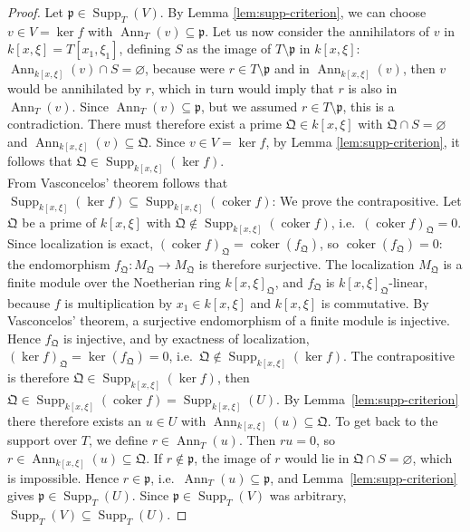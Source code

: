 \documentclass[pdflatex,sn-mathphys-num]{sn-jnl}
\numberwithin{equation}{section}
\theoremstyle{thmstyleone}
\theoremstyle{thmstyletwo}
\newcommand{\Supp}{\operatorname{Supp}}
\begin{document}
\begin{proof}
Let $\mathfrak p\in\operatorname{Supp}_T(V)$. By Lemma \ref{lem:supp-criterion}, we can choose $v\in V=\ker f$ with
$\operatorname{Ann}_T(v)\subseteq\mathfrak p$. Let us now consider the annihilators of $v$ in $k[x,\xi]=T[x_1, \xi_1]$, defining $S$ as the image of $T\setminus \mathfrak p$ in $k[x,\xi]$: $\operatorname{Ann}_{k[x,\xi]}(v)\cap S = \varnothing$, because were $r \in T\setminus\mathfrak p$ and in $\operatorname{Ann}_{k[x,\xi]}(v)$, then $v$ would be annihilated by $r$, which in turn would imply that $r$ is also in $\operatorname{Ann}_T(v)$. Since $\operatorname{Ann}_T(v) \subseteq \mathfrak p$, but we assumed $r \in T\setminus\mathfrak p$, this is a contradiction. There must therefore exist a prime $\mathfrak Q \in k[x,\xi]$ with $\mathfrak Q \cap S = \varnothing$ and $\operatorname{Ann}_{k[x,\xi]}(v) \subseteq \mathfrak Q$. Since $v \in V = \ker f$, by Lemma \ref{lem:supp-criterion}, it follows that $\mathfrak Q \in \Supp_{k[x,\xi]}(\ker f).$\\
From Vasconcelos' theorem \cite[Theorem~2.4]{matsumura} \cite{vasconcelos} follows that $\operatorname{Supp}_{k[x,\xi]}(\ker f)\subseteq \operatorname{Supp}_{k[x,\xi]}(\operatorname{coker}f)$: 
We prove the contrapositive. Let $\mathfrak Q$ be a prime of ${k[x,\xi]}$ with
$\mathfrak Q\notin\operatorname{Supp}_{k[x,\xi]}(\operatorname{coker}f)$, i.e.\
$(\operatorname{coker}f)_{\mathfrak Q}=0$.
Since localization is exact, $(\operatorname{coker}f)_{\mathfrak Q}=
\operatorname{coker}(f_{\mathfrak Q})$, so
$\operatorname{coker}(f_{\mathfrak Q})=0$: the endomorphism
$f_{\mathfrak Q}\colon M_{\mathfrak Q}\to M_{\mathfrak Q}$ is therefore surjective.
The localization $M_{\mathfrak Q}$ is a finite module over the Noetherian ring
${k[x,\xi]}_{\mathfrak Q}$, and $f_{\mathfrak Q}$ is ${k[x,\xi]}_{\mathfrak Q}$-linear, because
$f$ is multiplication by $x_1\in {k[x,\xi]}$ and ${k[x,\xi]}$ is commutative. By Vasconcelos'
theorem, a surjective endomorphism of a finite module is injective. Hence
$f_{\mathfrak Q}$ is injective, and by exactness of localization,
$(\ker f)_{\mathfrak Q}=\ker(f_{\mathfrak Q})=0$, i.e.\
$\mathfrak Q\notin\operatorname{Supp}_{k[x,\xi]}(\ker f)$. The contrapositive is therefore $\mathfrak Q\in\operatorname{Supp}_{k[x,\xi]}(\ker f)$,
then $\mathfrak Q\in\operatorname{Supp}_{k[x,\xi]}(\operatorname{coker}f) = \Supp_{k[x,\xi]}(U).$ By
Lemma~\ref{lem:supp-criterion} there therefore exists an $u\in U$ with
$\operatorname{Ann}_{k[x,\xi]}(u)\subseteq\mathfrak Q$. 
To get back to the support over $T$, we define $r\in\operatorname{Ann}_T(u)$. Then $ru=0$, so
$r\in\operatorname{Ann}_{k[x,\xi]}(u)\subseteq\mathfrak Q$. If $r\notin\mathfrak p$,
the image of $r$ would lie in $\mathfrak Q\cap S=\varnothing$, which is
impossible. Hence $r\in\mathfrak p$, i.e.\
$\operatorname{Ann}_T(u)\subseteq\mathfrak p$, and
Lemma~\ref{lem:supp-criterion} gives
$\mathfrak p\in\operatorname{Supp}_T(U)$. Since $\mathfrak p\in
\operatorname{Supp}_T(V)$ was arbitrary,
$\operatorname{Supp}_T(V)\subseteq\operatorname{Supp}_T(U)$.


\end{proof}
\end{document}
